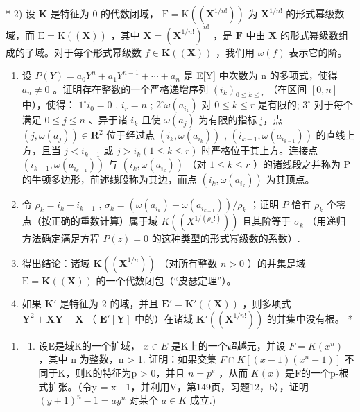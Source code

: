 * 2) 设 \(\mathbf{K}\) 是特征为 0 的代数闭域， \(\mathrm{F} = \mathrm{K}((\mathbf{X}^{1 / n!}))\) 为 \(\mathbf{X}^{1 / n!}\) 的形式幂级数域，而 \(\mathrm{E} = \mathrm{K}((\mathbf{X}))\) ，其中 \(\mathbf{X} = (\mathbf{X}^{1 / n!})^{n!}\) ，是 \(\mathbf{F}\) 中由 \(\mathbf{X}\) 的形式幂级数组成的子域。对于每个形式幂级数 \(f \in \mathbf{K}((\mathbf{X}))\) ，我们用 \(\omega(f)\) 表示它的阶。

\begin{enumerate}
\def\labelenumi{\alph{enumi})}
\item
  设 \(P(Y) = a_{0}Y^{n} + a_{1}Y^{n-1} + \cdots + a_{n}\) 是 E{[}Y{]} 中次数为 n 的多项式，使得 \(a_{n} \neq 0\) 。证明存在整数的一个严格递增序列 \((i_{k})_{0 \leqslant k \leqslant r}\) （在区间 \([0, n]\) 中），使得： \(1^{\circ} i_{0} = 0\) , \(i_{r} = n\) ; \(2^{\circ} \omega(a_{i_{k}})\) 对 \(0 \leqslant k \leqslant r\) 是有限的; \(3^{\circ}\) 对于每个满足 \(0 \leqslant j \leqslant n\) 、异于诸 \(i_{k}\) 且使 \(\omega(a_{j})\) 为有限的指标 j，点 \((j, \omega(a_{j})) \in \mathbf{R}^{2}\) 位于经过点 \((i_{k}, \omega(a_{i_{k}}))\) , \((i_{k-1}, \omega(a_{i_{k-1}}))\) 的直线上方，且当 \(j < i_{k-1}\) 或 \(j > i_{k} (1 \leqslant k \leqslant r)\) 时严格位于其上方。连接点 \((i_{k-1}, \omega(a_{i_{k-1}}))\) 与 \((i_{k}, \omega(a_{i_{k}}))\) （对 \(1 \leqslant k \leqslant r\) ）的诸线段之并称为 P 的牛顿多边形，前述线段称为其边，而点 \((i_{k}, \omega(a_{i_{k}}))\) 为其顶点。
\item
  令 \(\rho_{k} = i_{k} - i_{k - 1}\) , \(\sigma_{k} = (\omega (a_{i_{k}}) - \omega (a_{i_{k - 1}})) / \rho_{k}\) ；证明 \(P\) 恰有 \(\rho_{k}\) 个零点（按正确的重数计算）属于域 \(K((X^{1 / (\rho_k!)}))\) 且其阶等于 \(\sigma_{k}\) （用递归方法确定满足方程 \(P(z) = 0\) 的这种类型的形式幂级数的系数）.
\item
  得出结论：诸域 \(\mathbf{K}((\mathbf{X}^{1 / n}))\) （对所有整数 \(n > 0\) ）的并集是域 \(\mathrm{E} = \mathbf{K}((\mathbf{X}))\) 的一个代数闭包（“皮瑟定理”）。
\item
  如果 \(\mathbf{K}'\) 是特征为 2 的域，并且 \(\mathbf{E}' = \mathbf{K}'((\mathbf{X}))\) ，则多项式 \(\mathbf{Y}^2 + \mathbf{X}\mathbf{Y} + \mathbf{X}\) （ \(\mathbf{E}'[\mathbf{Y}]\) 中的）在诸域 \(\mathbf{K}'((\mathbf{X}^{1/n!}))\) 的并集中没有根。 *
\end{enumerate}

\BourbakiExerciseGroup

\begin{enumerate}
\def\labelenumi{\arabic{enumi})}
\tightlist
\item
  \begin{enumerate}
  \def\labelenumii{\alph{enumii})}
  \tightlist
  \item
    设E是域K的一个扩域， \(x \in E\) 是K上的一个超越元，并设 \(F = K(x^{n})\) ，其中 n 为整数，n \textgreater{} 1. 证明：如果交集 \(F \cap K[(x - 1)(x^{n} - 1)]\) 不同于K，则K的特征为p \textgreater{} 0，并且 \(n = p^{e}\) ，从而 \(K(x)\) 是F的一个p-根式扩张。（令y = x - 1，并利用V，第149页，习题12，b），证明 \((y + 1)^{n} - 1 = ay^{n}\) 对某个 \(a \in K\) 成立.)
  \end{enumerate}
\end{enumerate}

